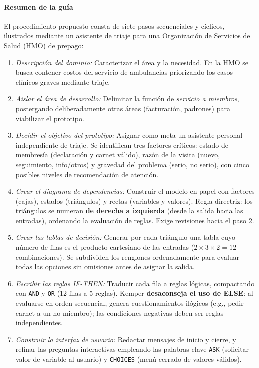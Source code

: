 \paragraph{Resumen de la gu\'ia} El procedimiento propuesto consta de
siete pasos secuenciales y c\'iclicos, ilustrados mediante un asistente
de triaje para una Organizaci\'on de Servicios de Salud (HMO) de
prepago:
\begin{enumerate}
	\item \emph{Descripci\'on del dominio:} Caracterizar el \'area y la
	necesidad. En la HMO se busca contener costos del servicio de
	ambulancias priorizando los casos cl\'inicos graves mediante triaje.
	\item \emph{Aislar el \'area de desarrollo:} Delimitar la funci\'on de
	\emph{servicio a miembros}, postergando deliberadamente otras \'areas
	(facturaci\'on, padrones) para viabilizar el prototipo.
	\item \emph{Decidir el objetivo del prototipo:} Asignar como meta un
	asistente personal independiente de triaje. Se identifican tres
	factores cr\'iticos: estado de membres\'ia (declaraci\'on y carnet
	v\'alido), raz\'on de la visita (nuevo, seguimiento, info/otros) y
	gravedad del problema (serio, no serio), con cinco posibles niveles
	de recomendaci\'on de atenci\'on.
	\item \emph{Crear el diagrama de dependencias:} Construir el modelo
	en papel con factores (cajas), estados (tri\'angulos) y rectas
	(variables y valores). Regla directriz: los tri\'angulos se numeran
	\textbf{de derecha a izquierda} (desde la salida hacia las entradas),
	ordenando la evaluaci\'on de reglas. Exige revisiones hacia el paso 2.
	\item \emph{Crear las tablas de decisi\'on:} Generar por cada
	tri\'angulo una tabla cuyo n\'umero de filas es el producto
	cartesiano de las entradas ($2 \times 3 \times 2 = 12$ combinaciones).
	Se subdividen los renglones ordenadamente para evaluar todas las
	opciones sin omisiones antes de asignar la salida.
	\item \emph{Escribir las reglas IF-THEN:} Traducir cada fila a
	reglas l\'ogicas, compactando con \texttt{AND} y \texttt{OR} (12 filas
	a 5 reglas). Kemper \textbf{desaconseja el uso de ELSE}: al evaluarse
	en orden secuencial, genera cuestionamientos il\'ogicos (e.g., pedir
	carnet a un no miembro); las condiciones negativas deben ser reglas
	independientes.
	\item \emph{Construir la interfaz de usuario:} Redactar mensajes de
	inicio y cierre, y refinar las preguntas interactivas empleando las
	palabras clave \texttt{ASK} (solicitar valor de variable al usuario) y
	\texttt{CHOICES} (men\'u cerrado de valores v\'alidos).
\end{enumerate}

